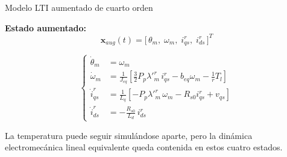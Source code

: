\documentclass[aspectratio=169,t]{beamer}
\begin{document}
\begin{frame}{Modelo LTI aumentado de cuarto orden}
\vspace{2mm}

\textbf{Estado aumentado:}
\begin{equation*}
\bm{x}_{aug}(t)=\big[\,\theta_m,\;\omega_m,\;i_{qs}^r,\;i_{ds}^{r}\,\big]^T
\end{equation*}

\footnotesize
\begin{equation*}
\left\{
\begin{aligned}
\dot{\theta}_m &= \omega_m \\[2pt]
\dot{\omega}_m &= \frac{1}{J_{eq}}\!\left[\frac{3}{2}P_p\lambda'^r_m\,i_{qs}^r-b_{eq}\omega_m-\frac{1}{r}T_l\right] \\[4pt]
\dot{i}_{qs}^r &= \frac{1}{L_q}\!\left[-P_p\lambda'^r_m\,\omega_m-R_{s0}i_{qs}^r+v_{qs}\right] \\[4pt]
\dot{i}_{ds}^{r} &= -\frac{R_{s0}}{L_d}\,i_{ds}^{r}
\end{aligned}
\right.
\end{equation*}
\normalsize

{\small La temperatura puede seguir simulándose aparte, pero la dinámica electromecánica lineal equivalente queda contenida en estos cuatro estados.}
\end{frame}
\end{document}
